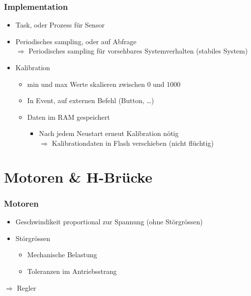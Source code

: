 \documentclass{beamer}
\begin{document}
\begin{frame}
	\frametitle{Implementation}
	\begin{itemize}
		\item{Task, oder Prozess für Sensor}
		\item{Periodisches sampling, oder auf Abfrage\\
		$\Rightarrow$ Periodisches sampling für vorsehbares Systemverhalten (stabiles System)}
		\item{Kalibration}
		\begin{itemize}
			\item{min und max Werte skalieren zwischen 0 und 1000}
			\item{In Event, auf externen Befehl (Button, \dots)}
			\item{Daten im RAM gespeichert}
			\begin{itemize}
				\item{Nach jedem Neustart erneut Kalibration nötig \\
				$\Rightarrow$ Kalibrationdaten in Flash verschieben (nicht flüchtig)}
			\end{itemize}
		\end{itemize}

	\end{itemize}
\end{frame}


\section{Motoren \& H-Brücke} %
\begin{frame}
	\frametitle{Motoren}
	\begin{itemize}
		\item{Geschwindikeit proportional zur Spannung (ohne Störgrössen)}
		\item{Störgrössen}
		\begin{itemize}
			\item{Mechanische Belastung}
			\item{Toleranzen im Antriebsstrang}
		\end{itemize}
	\end{itemize}

	\begin{exampleblock}{}
		\centering
		$\Rightarrow$ Regler
	\end{exampleblock}
	
\end{frame}
\end{document}
